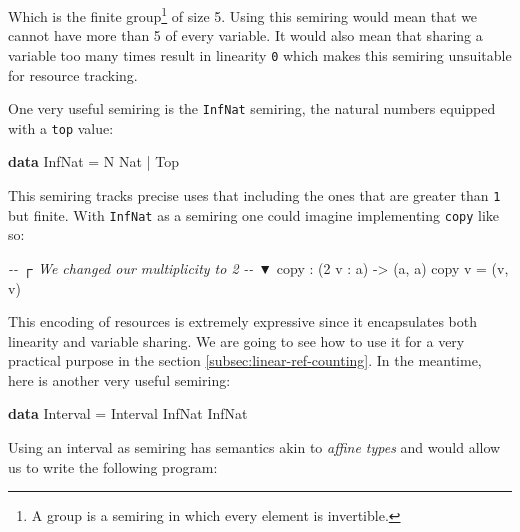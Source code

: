 \documentclass[
]{article}
\newenvironment{Shaded}{}{}
\newcommand{\CommentTok}[1]{\textcolor[rgb]{0.38,0.63,0.69}{\textit{#1}}}
\newcommand{\DataTypeTok}[1]{\textcolor[rgb]{0.56,0.13,0.00}{#1}}
\newcommand{\DecValTok}[1]{\textcolor[rgb]{0.25,0.63,0.44}{#1}}
\newcommand{\KeywordTok}[1]{\textcolor[rgb]{0.00,0.44,0.13}{\textbf{#1}}}
\newcommand{\NormalTok}[1]{#1}
\newcommand{\OperatorTok}[1]{\textcolor[rgb]{0.40,0.40,0.40}{#1}}
\newcommand{\OtherTok}[1]{\textcolor[rgb]{0.00,0.44,0.13}{#1}}
\begin{document}
Which is the finite group\footnote{A group is a semiring in which every
  element is invertible.} of size 5. Using this semiring would mean that
we cannot have more than 5 of every variable. It would also mean that
sharing a variable too many times result in linearity \texttt{0} which
makes this semiring unsuitable for resource tracking.

One very useful semiring is the \texttt{InfNat} semiring, the natural
numbers equipped with a \texttt{top} value:

\begin{Shaded}
\begin{Highlighting}[]
\KeywordTok{data} \DataTypeTok{InfNat} \OtherTok{=} \DataTypeTok{N} \DataTypeTok{Nat} \OperatorTok{|} \DataTypeTok{Top}
\end{Highlighting}
\end{Shaded}

This semiring tracks precise uses that including the ones that are
greater than \texttt{1} but finite. With \texttt{InfNat} as a semiring
one could imagine implementing \texttt{copy} like so:

\begin{Shaded}
\begin{Highlighting}[]
\CommentTok{{-}{-}      ┌ We changed our multiplicity to 2}
\CommentTok{{-}{-}      ▼}
\NormalTok{copy }\OperatorTok{:}\NormalTok{ (}\DecValTok{2}\NormalTok{ v }\OperatorTok{:}\NormalTok{ a) }\OtherTok{{-}\textgreater{}}\NormalTok{ (a, a)}
\NormalTok{copy v }\OtherTok{=}\NormalTok{ (v, v)}
\end{Highlighting}
\end{Shaded}

This encoding of resources is extremely expressive since it encapsulates
both linearity and variable sharing. We are going to see how to use it
for a very practical purpose in the section
\ref{subsec:linear-ref-counting}. In the meantime, here is another very
useful semiring:

\begin{Shaded}
\begin{Highlighting}[]
\KeywordTok{data} \DataTypeTok{Interval} \OtherTok{=} \DataTypeTok{Interval} \DataTypeTok{InfNat} \DataTypeTok{InfNat}
\end{Highlighting}
\end{Shaded}

Using an interval as semiring has semantics akin to \emph{affine types}
and would allow us to write the following program:
\end{document}
